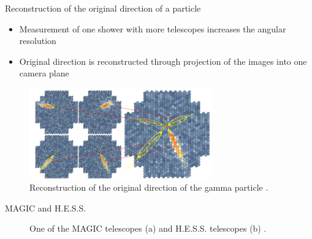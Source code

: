 \documentclass[aspectratio=1610, 10pt]{beamer}
\begin{document}
\begin{frame}{Reconstruction of the original direction of a particle}
  \begin{itemize}
    \item Measurement of one shower with more telescopes increases the angular resolution
    \medskip
    \item Original direction is reconstructed through projection of the images into one camera plane
  \end{itemize}
  \begin{figure}
    \includegraphics[width=0.7\textwidth]{images/reconstruction.png}
    \caption{Reconstruction of the original direction of the gamma particle \cite{iact}.}
  \end{figure}
\end{frame}

\begin{frame}{MAGIC and H.E.S.S.}
  \begin{figure}
      \hspace{0.5cm}
  \caption{One of the MAGIC telescopes (a) and H.E.S.S. telescopes (b) \cite{hess}.}
  \end{figure}
\end{frame}
\end{document}
